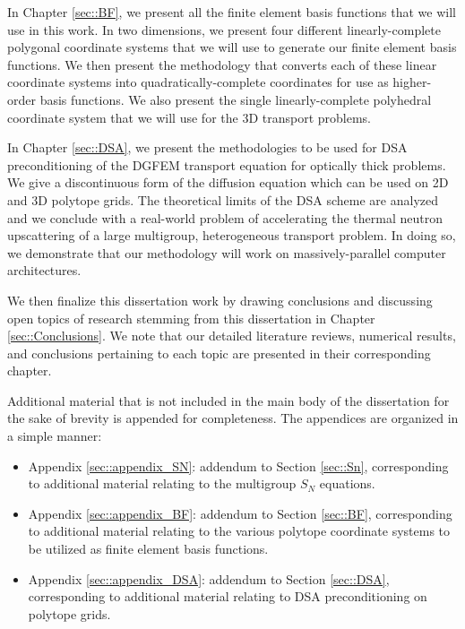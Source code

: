 In Chapter \ref{sec::BF}, we present all the finite element basis functions that we will use in this work. In two dimensions, we present four different linearly-complete polygonal coordinate systems that we will use to generate our finite element basis functions. We then present the methodology that converts each of these linear coordinate systems into quadratically-complete coordinates for use as higher-order basis functions. We also present the single linearly-complete polyhedral coordinate system that we will use for the 3D transport problems.

In Chapter \ref{sec::DSA}, we present the methodologies to be used for DSA preconditioning of the DGFEM transport equation for optically thick problems. We give a discontinuous form of the diffusion equation which can be used on 2D and 3D polytope grids. The theoretical limits of the DSA scheme are analyzed and we conclude with a real-world problem of accelerating the thermal neutron upscattering of a large multigroup, heterogeneous transport problem. In doing so, we demonstrate that our methodology will work on massively-parallel computer architectures.

We then finalize this dissertation work by drawing conclusions and discussing open topics of research stemming from this dissertation in Chapter \ref{sec::Conclusions}. We note that our detailed literature reviews, numerical results, and conclusions pertaining to each topic are presented in their corresponding chapter.

Additional material that is not included in the main body of the dissertation for the sake of brevity is appended for completeness. The appendices are organized in a simple manner:

\begin{itemize}
\item Appendix \ref{sec::appendix_SN}: addendum to Section \ref{sec::Sn}, corresponding to additional material relating to the multigroup $S_N$ equations.
\item Appendix \ref{sec::appendix_BF}: addendum to Section \ref{sec::BF}, corresponding to additional material relating to the various polytope coordinate systems to be utilized as finite element basis functions.
\item Appendix \ref{sec::appendix_DSA}: addendum to Section \ref{sec::DSA}, corresponding to additional material relating to DSA preconditioning on polytope grids.
\end{itemize}